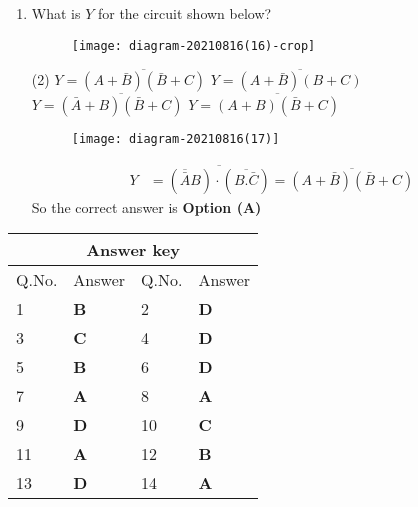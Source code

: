 \begin{enumerate}
	{}
\begin{figure}[H]
\centering
\texttt{[image: diagram-20210816(11)-crop.pdf]}
\end{figure}
\begin{tasks}(4)
\task[\textbf{A.}] $1,0,1$
\task[\textbf{B.}] $0,0,1$
\task[\textbf{C.}] $1,1,1$
\task[\textbf{D.}] $0,1,1$
\end{tasks}
\begin{answer}
XOR is inequality comparator and XNOR is equality comparator. In AND gate output will be high when all the input is 1 .\\\\
So the correct answer is \textbf{Option (D)}
\end{answer}
	\item What is $Y$ for the circuit shown below?
	{}
\begin{figure}[H]
\centering
\texttt{[image: diagram-20210816(16)-crop]}

\end{figure}
\begin{tasks}(2)
\task[\textbf{A.}] $Y=\overline{(A+\bar{B})(\bar{B}+C)}$
\task[\textbf{B.}]  $Y=\overline{(A+\bar{B})(B+C)}$
\task[\textbf{C.}] $Y=\overline{(\bar{A}+B)(\bar{B}+C)}$
\task[\textbf{D.}] $Y=\overline{(A+B)(\bar{B}+C)}$
\end{tasks}
\begin{answer}
\begin{figure}[H]
	\centering
	\texttt{[image: diagram-20210816(17)]}
\end{figure}
\begin{align*}
Y&=\overline{(\overline{\bar{A}} B) \cdot(\overline{B . \bar{C}})}=\overline{(A+\bar{B})(\bar{B}+C)}
\end{align*}
So the correct answer is \textbf{Option (A)}
\end{answer}
\end{enumerate}
\setlength\arrayrulewidth{1pt}
\begin{table}[H]
	\centering
	\begin{tabular}{|p{1.5cm}|p{1.5cm}||p{1.5cm}|p{1.5cm}|}
		\hline
		\multicolumn{4}{|c|}{\textbf{Answer key}}\\\hline\hline
		\rowcolor{ocrel}Q.No.&Answer&Q.No.&Answer\\\hline
		1&\textbf{B} &2&\textbf{D}\\\hline 
		3&\textbf{C} &4&\textbf{D} \\\hline
		5&\textbf{B} &6&\textbf{D} \\\hline
		7&\textbf{A}&8&\textbf{A}\\\hline
		9&\textbf{D}&10&\textbf{C}\\\hline
		11&\textbf{A} &12&\textbf{B}\\\hline
		13&\textbf{D}&14&\textbf{A}\\\hline
		
	\end{tabular}
\end{table}